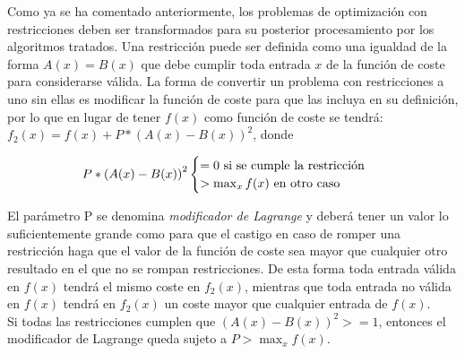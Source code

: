 Como ya se ha comentado anteriormente, los problemas de optimización con restricciones deben ser transformados para su posterior procesamiento por los algoritmos tratados.
Una restricción puede ser definida como una igualdad de la forma $A(x) = B(x)$ que debe cumplir toda entrada $x$ de la función de coste para considerarse válida.
La forma de convertir un problema con restricciones a uno sin ellas es modificar la función de coste para que las incluya en su definición, por lo que en lugar de tener $f(x)$ como función de coste se tendrá:
$f_2(x) = f(x) + P*{(A(x) - B(x))}^2$, donde

\begin{align}
  P*{(A(x) - B(x))}^2 \begin{cases}
    = 0 \textnormal{ si se cumple la restricción } \\
    > \max_x{f(x)} \textnormal{ en otro caso }
  \end{cases}
\end{align}

El parámetro P se denomina \textit{modificador de Lagrange} y deberá tener un valor lo suficientemente grande como para que el castigo en caso de romper una restricción haga que el valor de la función de coste sea mayor que cualquier otro resultado en el que no se rompan restricciones.
De esta forma toda entrada válida en $f(x)$ tendrá el mismo coste en $f_2(x)$, mientras que toda entrada no válida en $f(x)$ tendrá en $f_2(x)$ un coste mayor que cualquier entrada de $f(x)$.
\\
Si todas las restricciones cumplen que ${(A(x) - B(x))}^2 >= 1$, entonces el modificador de Lagrange queda sujeto a $P > \max_x{f(x)}$.


